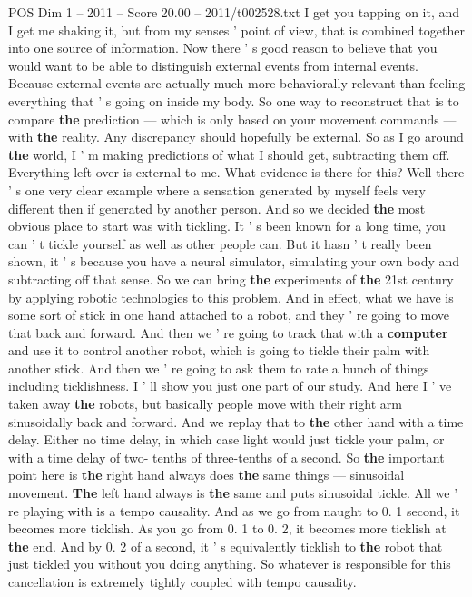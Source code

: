 \begin{textsample}{POS Dim 1 – 2011 – Score 20.00 – 2011/t002528.txt}
I get you tapping on it, and I get me shaking it, but from my senses ' point of view, that is combined together into one source of information.
Now there ' s good reason to believe that you would want to be able to distinguish external events from internal events.
Because external events are actually much more behaviorally relevant than feeling everything that ' s going on inside my body.
So one way to reconstruct that is to compare \textbf{the} prediction — which is only based on your movement commands — with \textbf{the} reality.
Any discrepancy should hopefully be external.
So as I go around \textbf{the} world, I ' m making predictions of what I should get, subtracting them off.
Everything left over is external to me.
What evidence is there for this?
Well there ' s one very clear example where a sensation generated by myself feels very different then if generated by another person.
And so we decided \textbf{the} most obvious place to start was with tickling.
It ' s been known for a long time, you can ' t tickle yourself as well as other people can.
But it hasn ' t really been shown, it ' s because you have a neural simulator, simulating your own body and subtracting off that sense.
So we can bring \textbf{the} experiments of \textbf{the} 21st century by applying robotic technologies to this problem.
And in effect, what we have is some sort of stick in one hand attached to a robot, and they ' re going to move that back and forward.
And then we ' re going to track that with a \textbf{computer} and use it to control another robot, which is going to tickle their palm with another stick.
And then we ' re going to ask them to rate a bunch of things including ticklishness.
I ' ll show you just one part of our study.
And here I ' ve taken away \textbf{the} robots, but basically people move with their right arm sinusoidally back and forward.
And we replay that to \textbf{the} other hand with a time delay.
Either no time delay, in which case light would just tickle your palm, or with a time delay of two- tenths of three-tenths of a second.
So \textbf{the} important point here is \textbf{the} right hand always does \textbf{the} same things — sinusoidal movement. \textbf{The} left hand always is \textbf{the} same and puts sinusoidal tickle.
All we ' re playing with is a tempo causality.
And as we go from naught to 0. 1 second, it becomes more ticklish.
As you go from 0. 1 to 0. 2, it becomes more ticklish at \textbf{the} end.
And by 0. 2 of a second, it ' s equivalently ticklish to \textbf{the} robot that just tickled you without you doing anything.
So whatever is responsible for this cancellation is extremely tightly coupled with tempo causality.

\end{textsample}
